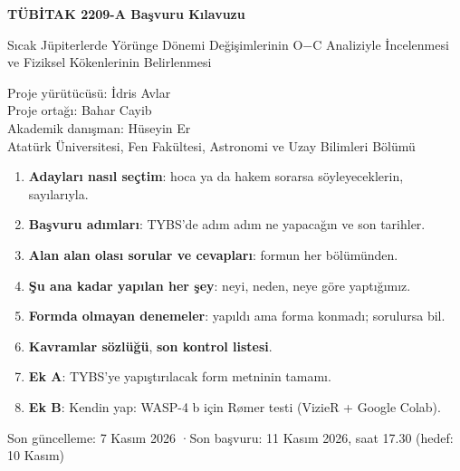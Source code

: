 \documentclass[11pt,a4paper]{article}
\newcounter{sor}[section]
\newcommand{\OC}{O$-$C}
\begin{document}
\begin{titlepage}
\centering
\vspace*{2cm}
{\LARGE\bfseries TÜBİTAK 2209-A Başvuru Kılavuzu\par}
\vspace{0.5cm}
{\Large Sıcak Jüpiterlerde Yörünge Dönemi Değişimlerinin \OC{} Analiziyle İncelenmesi ve Fiziksel Kökenlerinin Belirlenmesi\par}
\vspace{1.5cm}
{\large Proje yürütücüsü: İdris Avlar\\ Proje ortağı: Bahar Cayib\\ Akademik danışman: Hüseyin Er\\[0.3cm]
Atatürk Üniversitesi, Fen Fakültesi, Astronomi ve Uzay Bilimleri Bölümü\par}
\vspace{1.5cm}
\begin{minipage}{0.85\textwidth}
\begin{bilgi}
\begin{enumerate}
\item \textbf{Adayları nasıl seçtim}: hoca ya da hakem sorarsa söyleyeceklerin, sayılarıyla.
\item \textbf{Başvuru adımları}: TYBS'de adım adım ne yapacağın ve son tarihler.
\item \textbf{Alan alan olası sorular ve cevapları}: formun her bölümünden.
\item \textbf{Şu ana kadar yapılan her şey}: neyi, neden, neye göre yaptığımız.
\item \textbf{Formda olmayan denemeler}: yapıldı ama forma konmadı; sorulursa bil.
\item \textbf{Kavramlar sözlüğü}, \textbf{son kontrol listesi}.
\item \textbf{Ek A}: TYBS'ye yapıştırılacak form metninin tamamı.
\item \textbf{Ek B}: Kendin yap: WASP-4 b için Rømer testi (VizieR + Google Colab).
\end{enumerate}
\end{bilgi}
\end{minipage}
\vfill
{\small Son güncelleme: 7 Kasım 2026 \quad·\quad Son başvuru: 11 Kasım 2026, saat 17.30 (hedef: 10 Kasım)}
\end{titlepage}

\tableofcontents
\newpage

\end{document}
